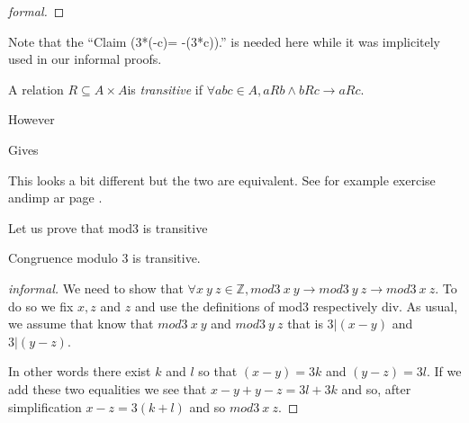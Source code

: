\begin{proof}[formal]


 \end{proof}
 
 Note that the ``Claim (3*(-c)= -(3*c)).'' is needed here while it was implicitely used in our informal proofs.
 
 
 
  \begin{definition}[transitive]
A relation $ R \subseteq A\times A$is {\it transitive} if $\forall a b c\in A, a R b \land b R c \rightarrow a R c$.
\end{definition}

However 

Gives

This looks a bit different but the two are equivalent. See for example exercise andimp ar page \pageref{prop:exercises}.


Let us prove that mod3 is transitive
\begin{lemma}
Congruence modulo 3 is transitive.
\end{lemma}
\begin{proof}[informal]
We need to show that $\forall x\  y \ z \in \mathbb{Z}, mod3\  x\ y \rightarrow mod3\ y\ z \rightarrow mod3\ x\ z $. 
To do so we fix $x, z$ and $z$ and use the definitions of mod3 respectively div. As usual, we assume that  know that $mod3\ x\ y$  and  $mod3\  y\ z$ that is $3 | (x-y)$ and $3 | (y-z)$. 

In other words there exist $k$ and $l$ so that $(x-y) = 3k$ and $(y-z) = 3l$. If we add these two equalities we see that $x-y+y-z= 3l+3k$ and so, after simplification $x-z= 3(k+l)$ and so $mod3 \ x \ z$.
\end{proof}

